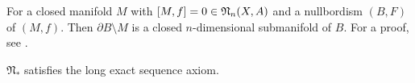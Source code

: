 \documentclass[a4paper,12pt]{article}
\begin{document}


\begin{remark}%
    For a closed manifold \(M\) with \([M,f]=0\in\mathfrak{N}_n(X,A)\) and a nullbordism \((B,F)\) of \((M,f)\). Then \(\partial B\setminus M\) is a closed \(n\)-dimensional submanifold of \(B\). For a proof, see \cite[Lemma 5.4]{zhang}.
\end{remark}

\begin{lemma}\label{les}
    \(\mathfrak{N}_\ast\) satisfies the long exact sequence axiom.
\end{lemma}

\end{document}
